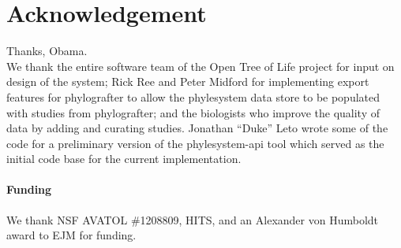 \documentclass{bioinfo}
\newcommand{\ps}{phylesystem\xspace}
\newcommand{\otol}{Open Tree of Life\xspace}
\begin{document}
\section*{Acknowledgement} Thanks, Obama.\\
We thank the entire software team of the \otol project for input on design of the system;
Rick Ree and Peter Midford for implementing export features for phylografter to allow the \ps
    data store to be populated with studies from phylografter; and 
the biologists who improve the quality of data by adding and curating studies.
Jonathan ``Duke'' Leto wrote some of the code for a preliminary version of the \ps-api tool
    which served as the initial code base for the current implementation.
\paragraph{Funding\textcolon} We thank NSF AVATOL \#1208809, HITS, and an Alexander von Humboldt award to EJM for funding.


\end{document}
